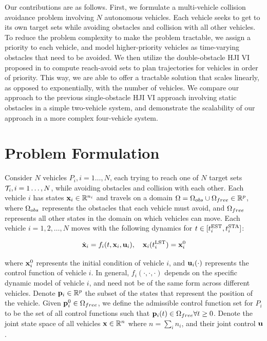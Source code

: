 \documentclass[letterpaper, 10pt, conference]{ieeeconf}      %
\begin{document}
Our contributions are as follows. First, we formulate a multi-vehicle collision avoidance problem involving $N$ autonomous vehicles. Each vehicle seeks to get to its own target sets while avoiding obstacles and collision with all other vehicles. To reduce the problem complexity to make the problem tractable, we assign a priority to each vehicle, and model higher-priority vehicles as time-varying obstacles that need to be avoided. We then utilize the double-obstacle HJI VI proposed in \cite{fisac15} to compute reach-avoid sets to plan trajectories for vehicles in order of priority. This way, we are able to offer a tractable solution that scales linearly, as opposed to exponentially, with the number of vehicles. We compare our approach to the previous single-obstacle HJI VI approach involving static obstacles \cite{mitchell05, bokanowski10, mitchell-thesis} in a simple two-vehicle system, and demonstrate the scalability of our approach in a more complex four-vehicle system.

% 
\section{Problem Formulation \label{sec:formulation}}
Consider $N$ vehicles $P_i,i=1\ldots,N$, each trying to reach one of $N$ target sets $\mathcal{T}_i,i=1\ldots,N$, while avoiding obstacles and collision with each other. Each vehicle $i$ has states $\mathbf{x}_i\in \mathbb{R}^{n_i}$ and travels on a domain $\Omega=\Omega_{obs} \cup \Omega_{free}\in\mathbb{R}^p$, where $\Omega_{obs}$ represents the obstacles that each vehicle must avoid, and $\Omega_{free}$ represents all other states in the domain on which vehicles can move. Each vehicle $i = 1,2,\ldots,N$ moves with the following dynamics for $t\in[t^{\text{EST}}_i, t^{\text{STA}}_i]$:

\begin{equation} \label{eq:dyn}
\dot{\mathbf{x}}_i = f_i (t, \mathbf{x}_i, \mathbf{u}_i), \quad\mathbf{x}_i(t^{\text{LST}}_i) = \mathbf{x}_i^0 
\end{equation}

\noindent where $\mathbf{x}_i^0$ represents the initial condition of vehicle $i$, and $\mathbf{u}_i(\cdot)$ represents the control function of vehicle $i$. In general, $f_i(\cdot,\cdot,\cdot)$ depends on the specific dynamic model of vehicle $i$, and need not be of the same form across different vehicles. Denote $\mathbf{p}_i\in\mathbb{R}^p$ the subset of the states that represent the position of the vehicle. Given $\mathbf{p}_i^0\in\Omega_{free}$, we define the admissible control function set for $P_i$ to be the set of all control functions such that $\mathbf{p}_i(t) \in \Omega_{free} \forall t\ge 0$. Denote the joint state space of all vehicles $\mathbf{x} \in \mathbb{R}^n$ where $n = \sum_i n_i$, and their joint control $\mathbf{u}$.
\end{document}
